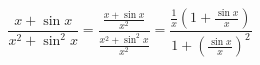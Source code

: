 



\[
	\frac{x + \sin x}{x^2 + \sin^2 x}
	= \frac{\frac{x + \sin x}{x^2}}{\frac{x^2 + \sin^2 x}{x^2}}
	= \frac{\frac{1}{x} (1 + \frac{\sin x}{x})}{1 + {(\frac{\sin x}{x})}^2}
\]



